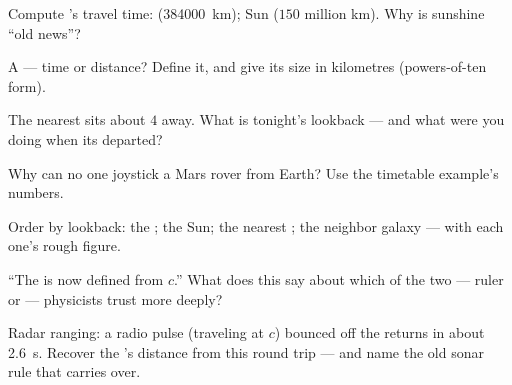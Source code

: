 \begin{exercise}[$\star$]\label{exo:g8:speed-of-light:3}
Compute 's travel time:  (\qty{384000}{km}); Sun
($150$ million km). Why is sunshine ``old news''?
\end{exercise}

\begin{exercise}[$\star$]\label{exo:g8:speed-of-light:4}
A  --- time or distance? Define it, and give its
size in kilometres (powers-of-ten form).
\end{exercise}

\begin{exercise}[$\star$]\label{exo:g8:speed-of-light:5}
The nearest  sits about $4$  away. What is
tonight's lookback --- and what were you doing when its
 departed?
\end{exercise}

\begin{exercise}[$\star$]\label{exo:g8:speed-of-light:6}
Why can no one joystick a Mars rover from Earth? Use the
timetable example's numbers.
\end{exercise}

\begin{exercise}[$\star$]\label{exo:g8:speed-of-light:7}
Order by lookback: the ; the Sun; the nearest ; the
neighbor galaxy --- with each one's rough figure.
\end{exercise}

\begin{exercise}[$\star$]\label{exo:g8:speed-of-light:8}
``The  is now defined from $c$.'' What does this say
about which of the two --- ruler or  --- physicists
trust more deeply?
\end{exercise}

\begin{exercise}[$\star\star$]\label{exo:g8:speed-of-light:9}
Radar ranging: a radio pulse (traveling at $c$) bounced off
the  returns in about \qty{2.6}{s}. Recover the 's
distance from this round trip --- and name the old sonar
rule that carries over.
\end{exercise}

